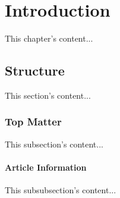 \documentclass[12pt,a4paper,fleqn]{report}
\title{\bf \TITLE}
\author{\AUTHOR}
\begin{document}
  
  \restoregeometry


  \setcounter{secnumdepth}{3} %
  \setcounter{tocdepth}{3} %

  \pagestyle{empty} %
{
  \cleardoublepage
  \hypersetup{
    linkcolor=black,
  }
  \tableofcontents %
  \listoffigures %
  \listoftables %
}

  \glsaddall
  \renewcommand*{\glossaryname}{Danh sách thuật ngữ}
  \renewcommand*{\acronymname}{Danh sách từ viết tắt}
  \renewcommand*{\entryname}{Tiếng Anh}
  \renewcommand*{\descriptionname}{Tiếng Việt}
  \printglossaries

  \chapter*{Introduction}
  This chapter's content...

  \section{Structure}
  This section's content...

  \subsection{Top Matter}
  This subsection's content...

  \subsubsection{Article Information}
  This subsubsection's content...
\end{document}
